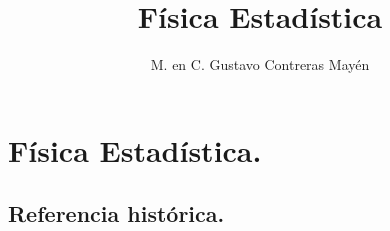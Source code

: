 
\title{Física Estadística\vspace{-3ex}}
\author{M. en C. Gustavo Contreras Mayén}
\date{ }



\vspace{-4cm}
\maketitle
\fontsize{14}{14}\selectfont
\tableofcontents
\newpage

\section{Física Estadística.}
\subsection{Referencia histórica.}


